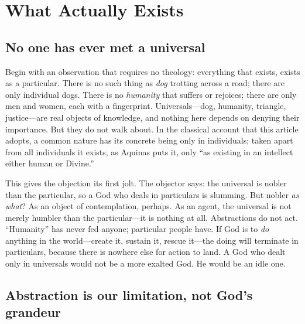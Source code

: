 \section{What Actually Exists}

\subsection{No one has ever met a universal}

Begin with an observation that requires no theology: everything that exists, exists as a particular. There is no such thing as \emph{dog} trotting across a road; there are only individual dogs. There is no \emph{humanity} that suffers or rejoices; there are only men and women, each with a fingerprint. Universals---dog, humanity, triangle, justice---are real objects of knowledge, and nothing here depends on denying their importance. But they do not walk about. In the classical account that this article adopts, a common nature has its concrete being only in individuals; taken apart from all individuals it exists, as Aquinas puts it, only ``as existing in an intellect either human or Divine.''

This gives the objection its first jolt. The objector says: the universal is nobler than the particular, so a God who deals in particulars is slumming. But nobler \emph{as what}? As an object of contemplation, perhaps. As an agent, the universal is not merely humbler than the particular---it is nothing at all. Abstractions do not act. ``Humanity'' has never fed anyone; particular people have. If God is to \emph{do} anything in the world---create it, sustain it, rescue it---the doing will terminate in particulars, because there is nowhere else for action to land. A God who dealt only in universals would not be a more exalted God. He would be an idle one.

\subsection{Abstraction is our limitation, not God's grandeur}

